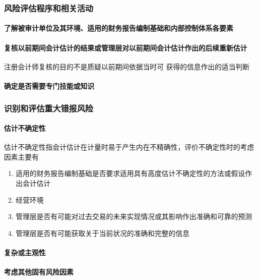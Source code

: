 \documentclass[UTF8,12pt]{ctexart}
\numberwithin{equation}{section} %
\numberwithin{figure}{section}
\numberwithin{table}{section}
\begin{document}
	\subsubsection{风险评估程序和相关活动}
	\paragraph{了解被审计单位及其环境、适用的财务报告编制基础和内部控制体系各要素}
	
	\paragraph{复核以前期间会计估计的结果或管理层对以前期间会计估计作出的后续重新估计}
	注册会计师复核的目的不是质疑以前期间依据当时可 获得的信息作出的适当判断
	
	\paragraph{确定是否需要专门技能或知识}
	
	\subsubsection{识别和评估重大错报风险}
	
	\paragraph{估计不确定性}
	估计不确定性指会计估计在计量时易于产生内在不精确性，评价不确定性时的考虑因素主要有
	\begin{enumerate}
		\item 适用的财务报告编制基础是否要求适用具有高度估计不确定性的方法或假设作出会计估计
		
		\item 经营环境
		
		\item 管理层是否有可能对过去交易的未来实现情况或其影响作出准确和可靠的预测
		
		\item 管理层是否有可能获取关于当前状况的准确和完整的信息
	\end{enumerate}
	
	
	\paragraph{复杂或主观性}
	
	\paragraph{考虑其他固有风险因素}
	
\end{document}
